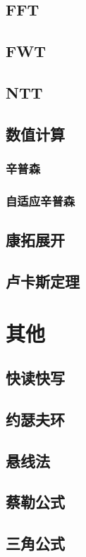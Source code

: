 \documentclass[twocolumn,a4]{article}
\newcommand{\addcpp}[1]{}
\begin{document}
	\subsection{FFT}
	\subsection{FWT}
	\subsection{NTT}
	\subsection{数值计算}
		\subsubsection{辛普森}
		\subsubsection{自适应辛普森}
			\addcpp{math/adaptive_simpson}
	\subsection{康拓展开}
	\subsection{卢卡斯定理}

\section{其他}
	\subsection{快读快写}
	\subsection{约瑟夫环}
	\subsection{悬线法}
	\subsection{蔡勒公式}
	\subsection{三角公式}
\end{document}
